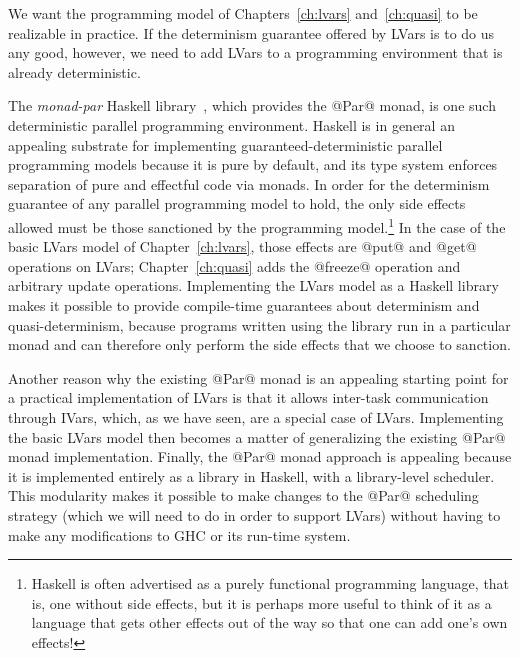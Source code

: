 We want the programming model of Chapters~\ref{ch:lvars}
and~\ref{ch:quasi} to be realizable in practice.  If the determinism
guarantee offered by LVars is to do us any good, however, we need to
add LVars to a programming environment that is already deterministic.

The \emph{monad-par} Haskell library~\cite{monad-par}, which provides
the @Par@ monad, is one such deterministic parallel programming
environment.  Haskell is in general an appealing substrate for
implementing guaranteed-deterministic parallel programming models
because it is pure by default, and its type system enforces separation
of pure and effectful code via monads.  In order for the determinism
guarantee of any parallel programming model to hold, the only side
effects allowed must be those sanctioned by the programming
model.\footnote{Haskell is often advertised as a purely functional
programming language, that is, one without side effects, but it is
perhaps more useful to think of it as a language that gets other
effects out of the way so that one can add one's own effects!}  In the
case of the basic LVars model of Chapter~\ref{ch:lvars}, those effects
are @put@ and @get@ operations on LVars; Chapter~\ref{ch:quasi} adds
the @freeze@ operation and arbitrary update operations.  Implementing
the LVars model as a Haskell library makes it possible to provide
compile-time guarantees about determinism and quasi-determinism,
because programs written using the library run in a particular monad
and can therefore only perform the side effects that we choose to
sanction.

Another reason why the existing @Par@ monad is an appealing starting
point for a practical implementation of LVars is that it allows
inter-task communication through IVars, which, as we have seen, are a
special case of LVars.  Implementing the basic LVars model then
becomes a matter of generalizing the existing @Par@ monad
implementation.  Finally, the @Par@ monad approach is appealing
because it is implemented entirely as a library in Haskell, with a
library-level scheduler.  This modularity makes it possible to make
changes to the @Par@ scheduling strategy (which we will need to do in
order to support LVars) without having to make any modifications to
GHC or its run-time system.


